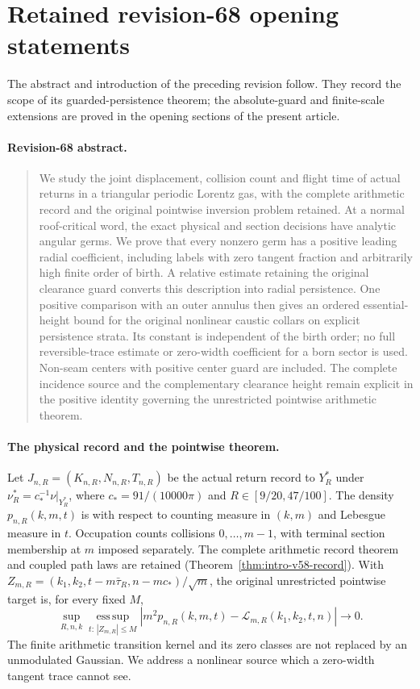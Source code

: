 \section{Retained revision-68 opening statements}
\label{app:v69-retained-front}
The abstract and introduction of the preceding revision follow. They
record the scope of its guarded-persistence theorem; the absolute-guard
and finite-scale extensions are proved in the opening sections of the
present article.
\paragraph{Revision-68 abstract.}
\begin{quotation}
We study the joint displacement, collision count and flight time of
actual returns in a triangular periodic Lorentz gas, with the complete
arithmetic record and the original pointwise inversion problem retained.
At a normal roof-critical word, the exact physical and section decisions
have analytic angular germs. We prove that every nonzero germ has a
positive leading radial coefficient, including labels with zero tangent
fraction and arbitrarily high finite order of birth. A relative estimate
retaining the original clearance guard converts this description into
radial persistence. One positive comparison with an outer annulus then
gives an ordered essential-height bound for the original nonlinear
caustic collars on explicit persistence strata. Its constant is
independent of the birth order; no full reversible-trace estimate or
zero-width coefficient for a born sector is used. Non-seam centers with
positive center guard are included. The complete incidence source and
the complementary clearance height remain explicit in the positive
identity governing the unrestricted pointwise arithmetic theorem.
\end{quotation}

\paragraph{The physical record and the pointwise theorem.}
Let $J_{n,R}=(K_{n,R},N_{n,R},T_{n,R})$ be the actual return record
to $Y_R^*$ under $\nu_R^*=c_*^{-1}\nu|_{Y_R^*}$, where
$c_*=91/(10000\pi)$ and $R\in[9/20,47/100]$.
The density $p_{n,R}(k,m,t)$ is with respect to counting measure in
$(k,m)$ and Lebesgue measure in $t$. Occupation counts collisions
$0,\ldots,m-1$, with terminal section membership at $m$ imposed
separately. The complete arithmetic record theorem and coupled path
laws are retained (Theorem~\ref{thm:intro-v58-record}). With
$Z_{m,R}=(k_1,k_2,t-m\bar\tau_R,n-mc_*)/\sqrt m$, the original
unrestricted pointwise target is, for every fixed $M$,
\begin{equation}\label{eq:intro-v68-pointwise-target}
 \sup_{R,n,k}\operatorname*{ess\,sup}_{t:\,|Z_{m,R}|\le M}
 \left|m^2p_{n,R}(k,m,t)-\mathcal L_{m,R}(k_1,k_2,t,n)\right|
                                     \longrightarrow0.
\end{equation}
The finite arithmetic transition kernel and its zero classes are not
replaced by an unmodulated Gaussian. We address a nonlinear source
which a zero-width tangent trace cannot see.


